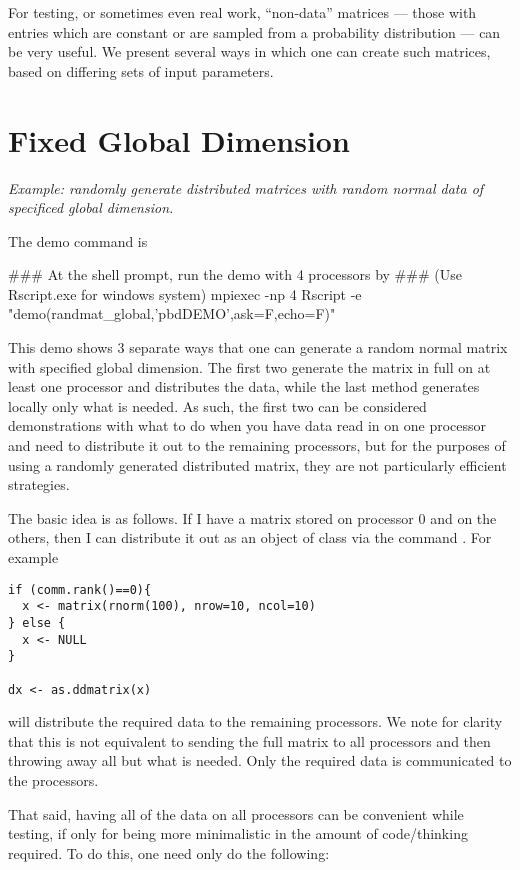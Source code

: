 For testing, or sometimes even real work, ``non-data'' matrices --- those with entries which are constant or are sampled from a probability distribution --- can be very useful.  We present several ways in which one can create such matrices, based on differing sets of input parameters.

\section{Fixed Global Dimension}\label{subsec:rng.gl}

\emph{Example:  randomly generate distributed matrices with random normal data of specificed global dimension.}

The demo command is
\begin{Command}
### At the shell prompt, run the demo with 4 processors by
### (Use Rscript.exe for windows system)
mpiexec -np 4 Rscript -e "demo(randmat_global,'pbdDEMO',ask=F,echo=F)"
\end{Command}

This demo shows 3 separate ways that one can generate a random normal matrix with specified global dimension.  The first two generate the matrix in full on at least one processor and distributes the data, while the last method generates locally only what is needed.  As such, the first two can be considered demonstrations with what to do when you have data read in on one processor and need to distribute it out to the remaining processors, but for the purposes of using a randomly generated distributed matrix, they are not particularly efficient strategies.

The basic idea is as follows.  If I have a matrix  stored on processor 0 and  on the others, then I can distribute it out as an object of class  via the command .  For example
\begin{lstlisting}[language=rr]
if (comm.rank()==0){
  x <- matrix(rnorm(100), nrow=10, ncol=10)
} else {
  x <- NULL
}

dx <- as.ddmatrix(x)
\end{lstlisting}

will distribute the required data to the remaining processors.  We note for clarity that this is not equivalent to sending the full matrix to all processors and then throwing away all but what is needed.  Only the required data is communicated to the processors.

That said, having all of the data on all processors can be convenient while testing, if only for being more minimalistic in the amount of code/thinking required.  To do this, one need only do the following:

